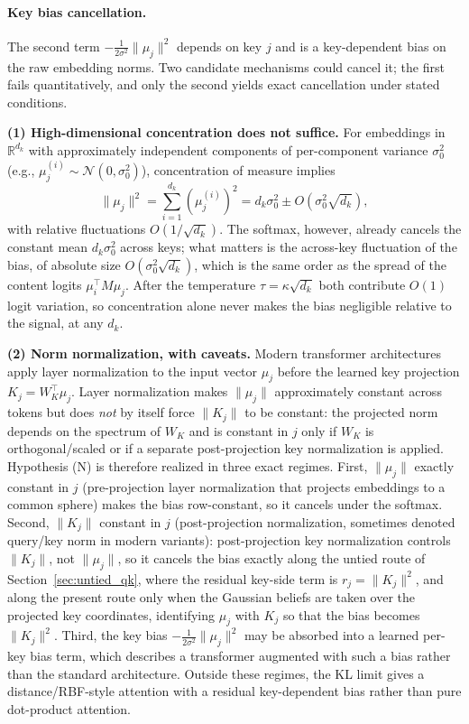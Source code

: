 \documentclass[11pt]{article}
\begin{document}
\paragraph{Key bias cancellation.}
The second term $-\frac{1}{2\sigma^2}\|\mu_j\|^2$ depends on key $j$ and is a key-dependent bias on the raw embedding norms. Two candidate mechanisms could cancel it; the first fails quantitatively, and only the second yields exact cancellation under stated conditions.

\textbf{(1) High-dimensional concentration does not suffice.}
For embeddings in $\mathbb{R}^{d_k}$ with approximately independent components of per-component variance $\sigma_0^2$ (e.g., $\mu_j^{(i)} \sim \mathcal{N}(0, \sigma_0^2)$), concentration of measure implies
\begin{equation}
\|\mu_j\|^2 = \sum_{i=1}^{d_k} (\mu_j^{(i)})^2 = d_k\sigma_0^2 \pm O(\sigma_0^2\sqrt{d_k}),
\end{equation}
with relative fluctuations $O(1/\sqrt{d_k})$. The softmax, however, already cancels the constant mean $d_k\sigma_0^2$ across keys; what matters is the across-key fluctuation of the bias, of absolute size $O(\sigma_0^2\sqrt{d_k})$, which is the same order as the spread of the content logits $\mu_i^\top M\mu_j$. After the temperature $\tau = \kappa\sqrt{d_k}$ both contribute $O(1)$ logit variation, so concentration alone never makes the bias negligible relative to the signal, at any $d_k$.

\textbf{(2) Norm normalization, with caveats.}
Modern transformer architectures apply layer normalization to the input vector $\mu_j$ before the learned key projection $K_j = W_K^\top \mu_j$. Layer normalization makes $\|\mu_j\|$ approximately constant across tokens but does \emph{not} by itself force $\|K_j\|$ to be constant: the projected norm depends on the spectrum of $W_K$ and is constant in $j$ only if $W_K$ is orthogonal/scaled or if a separate post-projection key normalization is applied. Hypothesis (N) is therefore realized in three exact regimes. First, $\|\mu_j\|$ exactly constant in $j$ (pre-projection layer normalization that projects embeddings to a common sphere) makes the bias row-constant, so it cancels under the softmax. Second, $\|K_j\|$ constant in $j$ (post-projection normalization, sometimes denoted query/key norm in modern variants): post-projection key normalization controls $\|K_j\|$, not $\|\mu_j\|$, so it cancels the bias exactly along the untied route of Section~\ref{sec:untied_qk}, where the residual key-side term is $r_j = \|K_j\|^2$, and along the present route only when the Gaussian beliefs are taken over the projected key coordinates, identifying $\mu_j$ with $K_j$ so that the bias becomes $\|K_j\|^2$. Third, the key bias $-\tfrac{1}{2\sigma^2}\|\mu_j\|^2$ may be absorbed into a learned per-key bias term, which describes a transformer augmented with such a bias rather than the standard architecture. Outside these regimes, the KL limit gives a distance/RBF-style attention with a residual key-dependent bias rather than pure dot-product attention.
\end{document}

